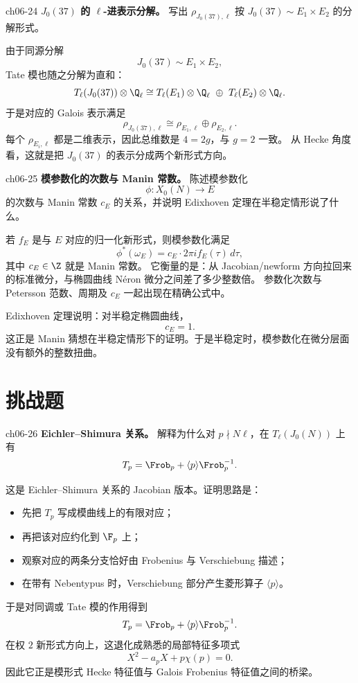 \begin{problem}{ch06-24}
\textbf{$J_0(37)$ 的 $\ell$-进表示分解。}
写出 $\rho_{J_0(37),\ell}$ 按 $J_0(37)\sim E_1\times E_2$ 的分解形式。
\end{problem}
\begin{solution}
由于同源分解
\[
J_0(37)\sim E_1\times E_2,
\]
Tate 模也随之分解为直和：
\[
T_\ell(J_0(37))\otimes \Q_\ell
\cong
T_\ell(E_1)\otimes \Q_\ell\ \oplus\ T_\ell(E_2)\otimes \Q_\ell.
\]
于是对应的 Galois 表示满足
\[
\rho_{J_0(37),\ell}
\cong
\rho_{E_1,\ell}\oplus \rho_{E_2,\ell}.
\]
每个 $\rho_{E_i,\ell}$ 都是二维表示，因此总维数是 $4=2g$，与 $g=2$ 一致。
从 Hecke 角度看，这就是把 $J_0(37)$ 的表示分成两个新形式方向。
\end{solution}

\begin{problem}{ch06-25}
\textbf{模参数化的次数与 Manin 常数。}
陈述模参数化
\[
\phi:X_0(N)\to E
\]
的次数与 Manin 常数 $c_E$ 的关系，并说明 Edixhoven 定理在半稳定情形说了什么。
\end{problem}
\begin{solution}
若 $f_E$ 是与 $E$ 对应的归一化新形式，则模参数化满足
\[
\phi^*(\omega_E)=c_E\cdot 2\pi i f_E(\tau)\,d\tau,
\]
其中 $c_E\in \Z$ 就是 Manin 常数。
它衡量的是：从 Jacobian/newform 方向拉回来的标准微分，与椭圆曲线 N\'eron 微分之间差了多少整数倍。
参数化次数与 Petersson 范数、周期及 $c_E$ 一起出现在精确公式中。

Edixhoven 定理说明：对半稳定椭圆曲线，
\[
c_E=1.
\]
这正是 Manin 猜想在半稳定情形下的证明。于是半稳定时，模参数化在微分层面没有额外的整数扭曲。
\end{solution}

\section{挑战题 \hard}

\begin{problem}{ch06-26}
\textbf{Eichler--Shimura 关系。}
解释为什么对 $p\nmid N\ell$，在 $T_\ell(J_0(N))$ 上有
\[
T_p=\Frob_p+\langle p\rangle\Frob_p^{-1}.
\]
\end{problem}
\begin{solution}
这是 Eichler--Shimura 关系的 Jacobian 版本。证明思路是：
\begin{itemize}
  \item 先把 $T_p$ 写成模曲线上的有限对应；
  \item 再把该对应约化到 $\F_p$ 上；
  \item 观察对应的两条分支恰好由 Frobenius 与 Verschiebung 描述；
  \item 在带有 Nebentypus 时，Verschiebung 部分产生菱形算子 $\langle p\rangle$。
\end{itemize}
于是对同调或 Tate 模的作用得到
\[
T_p=\Frob_p+\langle p\rangle\Frob_p^{-1}.
\]
在权 $2$ 新形式方向上，这退化成熟悉的局部特征多项式
\[
X^2-a_pX+p\chi(p)=0.
\]
因此它正是模形式 Hecke 特征值与 Galois Frobenius 特征值之间的桥梁。
\end{solution}

